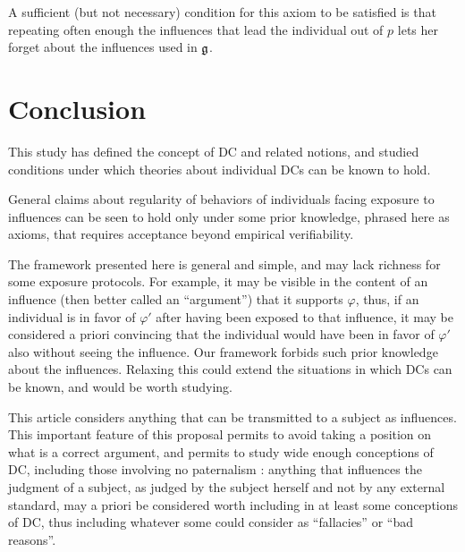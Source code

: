 \documentclass[version=last, pagesize, twoside=off, bibliography=totoc, fontsize=12pt, a4paper, french, english]{scrartcl}
\begin{document}
A sufficient (but not necessary) condition for this axiom to be satisfied is that repeating often enough the influences that lead the individual out of $p$ lets her forget about the influences used in $\mathfrak{g}$.

\section{Conclusion}
This study has defined the concept of \ac{DC} and related notions, and studied conditions under which theories about individual \acp{DC} can be known to hold.

General claims about regularity of behaviors of individuals facing exposure to influences can be seen to hold only under some prior knowledge, phrased here as axioms, that requires acceptance beyond empirical verifiability.


The framework presented here is general and simple, and may lack richness for some exposure protocols. For example, it may be visible in the content of an influence (then better called an “argument”) that it supports $φ$, thus, if an individual is in favor of $φ'$ after having been exposed to that influence, it may be considered a priori convincing that the individual would have been in favor of $φ'$ also without seeing the influence. Our framework forbids such prior knowledge about the influences. Relaxing this could extend the situations in which \acp{DC} can be known, and would be worth studying.

This article considers anything that can be transmitted to a subject as influences. This important feature of this proposal permits to avoid taking a position on what is a correct argument, and permits to study wide enough conceptions of \ac{DC}, including those involving no paternalism \citep{cailloux_formal_2020}: anything that influences the judgment of a subject, as judged by the subject herself and not by any external standard, may a priori be considered worth including in at least some conceptions of \ac{DC}, thus including whatever some could consider as “fallacies” or “bad reasons”.
\end{document}
